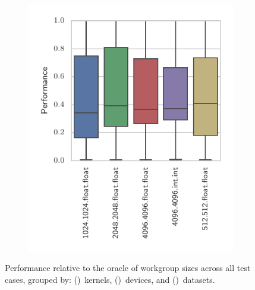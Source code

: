 \documentclass[nonatbib,preprint,10pt]{sigplanconf}
\begin{document}
\begin{figure}
\begin{subfigure}[h]{.48\columnwidth}
    \vspace{-1.5em} %
    \caption{}
    \label{fig:performance-devices}
  \end{subfigure}
  ~%
  \begin{subfigure}[h]{.48\columnwidth}
    \centering
    \includegraphics[width=\columnwidth]{img/performance_datasets.pdf}
    \vspace{-1.5em} %
    \caption{}
    \label{fig:performance-datasets}
  \end{subfigure}
  \caption[Workgroup size performances across device, kernel, and dataset]{%
    Performance relative to the oracle of workgroup sizes across all
    test cases, grouped by: ()~kernels,
    ()~devices, and
    ()~datasets.%
  }
  \label{fig:performances}
\end{figure}


\end{document}
